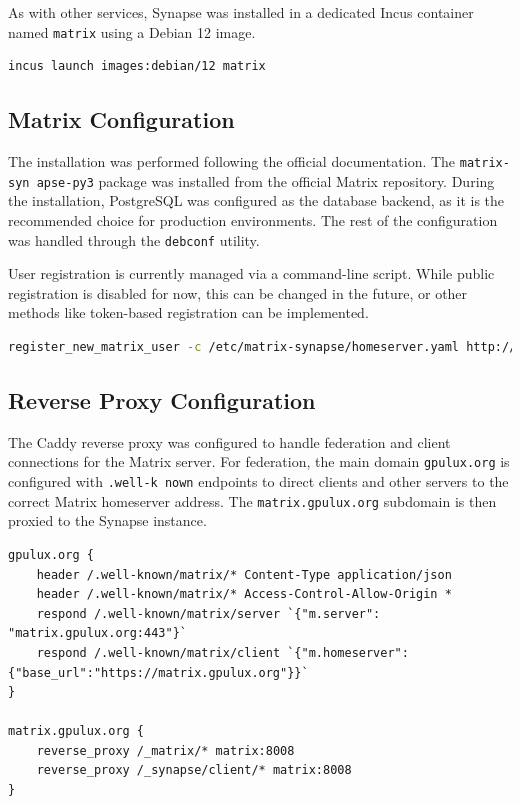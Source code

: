 As with other services, Synapse was installed in a dedicated Incus container named \texttt{matrix} using a Debian 12 image.

\begin{lstlisting}[language=bash,caption={Creating the Matrix container.}]
incus launch images:debian/12 matrix
\end{lstlisting}

\subsection*{Matrix Configuration}

The installation was performed following the official documentation\cite{synapse-install-debian}. The \texttt{matrix-syn apse-py3} package was installed from the official Matrix repository. During the installation, PostgreSQL was configured as the database backend, as it is the recommended choice for production environments. The rest of the configuration was handled through the \texttt{debconf} utility.

User registration is currently managed via a command-line script. While public registration is disabled for now, this can be changed in the future, or other methods like token-based registration can be implemented.

\begin{lstlisting}[language=bash,caption={Command to register a new Matrix user.}]
register_new_matrix_user -c /etc/matrix-synapse/homeserver.yaml http://localhost:8008
\end{lstlisting}

\subsection*{Reverse Proxy Configuration}

The Caddy reverse proxy was configured to handle federation and client connections for the Matrix server. For federation, the main domain \texttt{gpulux.org} is configured with \texttt{.well-k nown} endpoints to direct clients and other servers to the correct Matrix homeserver address. The \texttt{matrix.gpulux.org} subdomain is then proxied to the Synapse instance.

\begin{lstlisting}[caption={Caddyfile configuration for Matrix Synapse.}]
gpulux.org {
    header /.well-known/matrix/* Content-Type application/json
    header /.well-known/matrix/* Access-Control-Allow-Origin *
    respond /.well-known/matrix/server `{"m.server": "matrix.gpulux.org:443"}`
    respond /.well-known/matrix/client `{"m.homeserver":{"base_url":"https://matrix.gpulux.org"}}`
}

matrix.gpulux.org {
    reverse_proxy /_matrix/* matrix:8008
    reverse_proxy /_synapse/client/* matrix:8008
}
\end{lstlisting}

